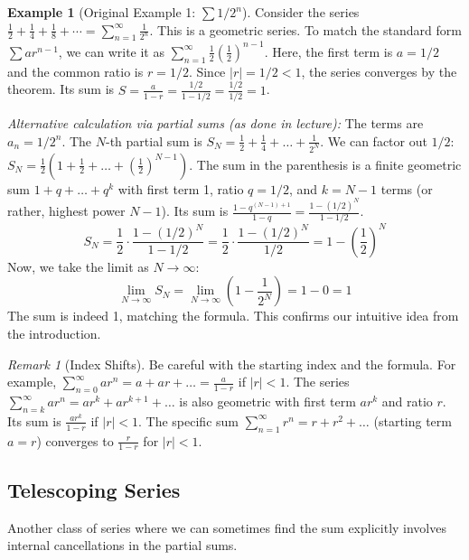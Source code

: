 \documentclass[11pt, letterpaper]{article}
\theoremstyle{plain} %
\theoremstyle{definition} %
\newtheorem{example}[theorem]{Example} %
\theoremstyle{remark} %
\newtheorem{remark}[theorem]{Remark} %
\newcommand{\abs}[1]{\left|#1\right|} %
\begin{document}
\begin{example}[Original Example 1: $\sum 1/2^n$]
Consider the series $\frac{1}{2} + \frac{1}{4} + \frac{1}{8} + \dotsb = \sum_{n=1}^{\infty} \frac{1}{2^n}$.
This is a geometric series. To match the standard form $\sum a r^{n-1}$, we can write it as $\sum_{n=1}^{\infty} \frac{1}{2} \left(\frac{1}{2}\right)^{n-1}$.
Here, the first term is $a = 1/2$ and the common ratio is $r = 1/2$.
Since $\abs{r} = 1/2 < 1$, the series converges by the theorem.
Its sum is $S = \frac{a}{1-r} = \frac{1/2}{1 - 1/2} = \frac{1/2}{1/2} = 1$.

\textit{Alternative calculation via partial sums (as done in lecture):}
The terms are $a_n = 1/2^n$.
The $N$-th partial sum is $S_N = \frac{1}{2} + \frac{1}{4} + \dots + \frac{1}{2^N}$.
We can factor out $1/2$: $S_N = \frac{1}{2} \left( 1 + \frac{1}{2} + \dots + \left(\frac{1}{2}\right)^{N-1} \right)$.
The sum in the parenthesis is a finite geometric sum $1+q+\dots+q^{k}$ with first term 1, ratio $q=1/2$, and $k=N-1$ terms (or rather, highest power $N-1$). Its sum is $\frac{1-q^{(N-1)+1}}{1-q} = \frac{1-(1/2)^N}{1-1/2}$.
\[ S_N = \frac{1}{2} \cdot \frac{1 - (1/2)^N}{1 - 1/2} = \frac{1}{2} \cdot \frac{1 - (1/2)^N}{1/2} = 1 - \left(\frac{1}{2}\right)^N \]
Now, we take the limit as $N \to \infty$:
\[ \lim_{N \to \infty} S_N = \lim_{N \to \infty} \left( 1 - \frac{1}{2^N} \right) = 1 - 0 = 1 \]
The sum is indeed 1, matching the formula. This confirms our intuitive idea from the introduction.
\end{example}

\begin{remark}[Index Shifts]
Be careful with the starting index and the formula. For example, $\sum_{n=0}^{\infty} ar^n = a + ar + \dots = \frac{a}{1-r}$ if $|r|<1$. The series $\sum_{n=k}^{\infty} ar^n = ar^k + ar^{k+1} + \dots$ is also geometric with first term $ar^k$ and ratio $r$. Its sum is $\frac{ar^k}{1-r}$ if $|r|<1$.
The specific sum $\sum_{n=1}^{\infty} r^n = r + r^2 + \dots$ (starting term $a=r$) converges to $\frac{r}{1-r}$ for $|r|<1$.
\end{remark}

\subsection{Telescoping Series}

Another class of series where we can sometimes find the sum explicitly involves internal cancellations in the partial sums.
\end{document}
